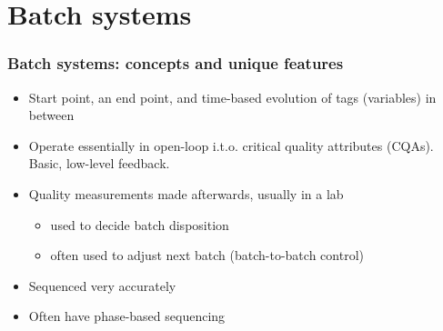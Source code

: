 \section{Batch systems}

\begin{frame}\frametitle{Batch systems: concepts and unique features}

\begin{itemize}
	\item 	Start point, an end point, and time-based evolution of tags (variables) in between 
	
	\item 	Operate essentially in open-loop i.t.o. critical quality attributes (CQAs).  Basic, low-level feedback. \pause
	
	\item 	Quality measurements made afterwards, usually in a lab
	
			\begin{itemize}
				\item	used to decide batch disposition
				\item	often used to adjust next batch (batch-to-batch control)
			\end{itemize}\pause
			
	\item	Sequenced very accurately
	
	\item	Often have phase-based sequencing

\end{itemize}
\end{frame}

